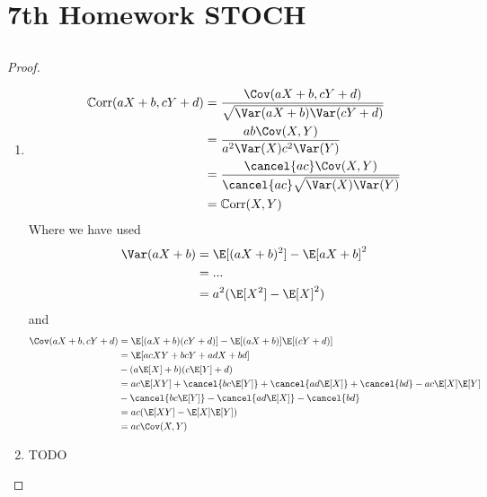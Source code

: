 
\section{7th Homework STOCH}
\subsection{}
\begin{proof}
	\begin{enumerate}
		\item \begin{align*}
			\Corr(aX + b,cY+d) &= \frac{\Cov(aX+b, cY+d)}{\sqrt{\Var(aX+b)\Var(cY+d)}}\\
			&= \frac{ab\Cov(X,Y)}{a^2\Var(X)c^2\Var(Y)}\\
			&= \frac{\cancel{ac}\Cov(X,Y)}{\cancel{ac}\sqrt{\Var(X)\Var(Y)}}\\
			&= \Corr(X,Y)
		\end{align*}
		Where we have used
		\begin{align*}
			\Var(aX+b) &= \E[(aX+b)^2]- \E[aX+b]^2\\
			&= ...\\ %
			&= a^2(\E[X^2] - \E[X]^2)
		\end{align*}
		and 
		\begin{align*}
			\Cov(aX+b,cY+d) &= \E[(aX+b)(cY+d)]-\E[(aX+b)]\E[(cY+d)]\\
			&= \E[acXY + bcY + adX + bd] \\
			&- (a\E[X]+b)(c\E[Y]+d)\\
			&= ac\E[XY]+\cancel{bc\E[Y]} + \cancel{ad\E[X]} + \cancel{bd} - ac\E[X]\E[Y]\\
			&- \cancel{bc \E[Y]} - \cancel{ad\E[X]} - \cancel{bd}\\
			&= ac(\E[XY] - \E[X]\E[Y])\\
			&= ac\Cov(X,Y)
		\end{align*}
		\item TODO
	\end{enumerate}
\end{proof}

